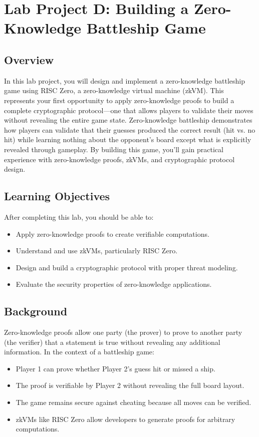 \documentclass[10pt,a4paper,american]{article}
\begin{document}
\classhandoutheader

\section*{Lab Project D: Building a Zero-Knowledge Battleship Game}

\subsection*{Overview}
In this lab project, you will design and implement a zero-knowledge battleship game using RISC Zero, a zero-knowledge virtual machine (zkVM). This represents your first opportunity to apply zero-knowledge proofs to build a complete cryptographic protocol—one that allows players to validate their moves without revealing the entire game state. Zero-knowledge battleship demonstrates how players can validate that their guesses produced the correct result (hit vs. no hit) while learning nothing about the opponent's board except what is explicitly revealed through gameplay. By building this game, you'll gain practical experience with zero-knowledge proofs, zkVMs, and cryptographic protocol design.

\subsection*{Learning Objectives}
After completing this lab, you should be able to:
\begin{itemize}
	\item Apply zero-knowledge proofs to create verifiable computations.
	\item Understand and use zkVMs, particularly RISC Zero.
	\item Design and build a cryptographic protocol with proper threat modeling.
	\item Evaluate the security properties of zero-knowledge applications.
\end{itemize}

\subsection*{Background}
Zero-knowledge proofs allow one party (the prover) to prove to another party (the verifier) that a statement is true without revealing any additional information. In the context of a battleship game:
\begin{itemize}
	\item Player 1 can prove whether Player 2's guess hit or missed a ship.
	\item The proof is verifiable by Player 2 without revealing the full board layout.
	\item The game remains secure against cheating because all moves can be verified.
	\item zkVMs like RISC Zero allow developers to generate proofs for arbitrary computations.
\end{itemize}
\end{document}
